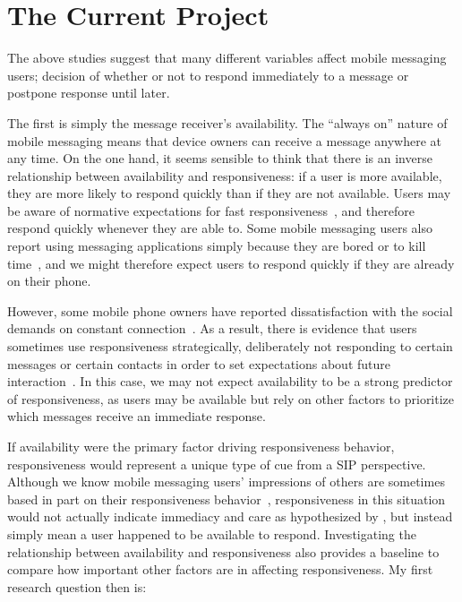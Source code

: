 \documentclass[12pt]{nuthesis}	%
\begin{document}
\chapter{The Current Project}

The above studies suggest that many different variables affect mobile messaging users; decision of whether or not to respond immediately to a message or postpone response until later.

The first is simply the message receiver's availability. The ``always on'' nature of mobile messaging means that device owners can receive a message anywhere at any time. On the one hand, it seems sensible to think that there is an inverse relationship between availability and responsiveness: if a user is more available, they are more likely to respond quickly than if they are not available. Users may be aware of normative expectations for fast responsiveness~\citep{church2013s,rettie2009mobile}, and therefore respond quickly whenever they are able to. Some mobile messaging users also report using messaging applications simply because they are bored or to kill time~\citep{battestini2010large}, and we might therefore expect users to respond quickly if they are already on their phone.

However, some mobile phone owners have reported dissatisfaction with the social demands on constant connection~\citep{ames2013managing}. As a result, there is evidence that users sometimes use responsiveness strategically, deliberately not responding to certain messages or certain contacts in order to set expectations about future interaction~\citep{wohn2015ambient}. In this case, we may not expect availability to be a strong predictor of responsiveness, as users may be available but rely on other factors to prioritize which messages receive an immediate response.


If availability were the primary factor driving responsiveness behavior, responsiveness would represent a unique type of cue from a SIP perspective. Although we know mobile messaging users' impressions of others are sometimes based in part on their responsiveness behavior~\citep{church2013s}, responsiveness in this situation would not actually indicate immediacy and care as hypothesized by \citet{walther1995nonverbal}, but instead simply mean a user happened to be available to respond. Investigating the relationship between availability and responsiveness also provides a baseline to compare how important other factors are in affecting responsiveness. My first research question then is:
\end{document}
